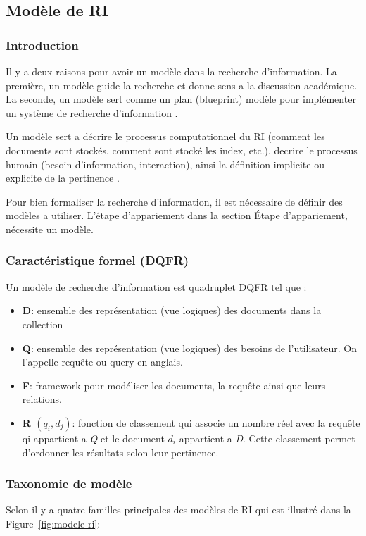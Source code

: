\subsection{Modèle de RI}
\subsubsection{Introduction}
Il y a deux raisons pour avoir un modèle dans la recherche d'information. La première, un modèle guide la recherche et donne sens a la discussion académique. La seconde, un modèle sert comme un plan (blueprint) modèle pour implémenter un système de recherche d'information \citep{model-ir}.

Un modèle sert a décrire le processus computationnel du RI (comment les documents sont stockés, comment sont stocké les index, etc.), decrire le processus humain (besoin d'information, interaction), ainsi la définition implicite ou explicite de la pertinence \citep{model-ri-cours}.

Pour bien formaliser la recherche d'information, il est nécessaire de définir des modèles a utiliser. L'étape d’appariement dans la section Étape d'appariement, nécessite un modèle.

\subsubsection{Caractéristique formel (DQFR)}
\begin{definition}
    Un modèle de recherche d'information est quadruplet DQFR tel que \citep*{modern-ir, vsm}:
    \begin{itemize}
        \item \textbf{D}: ensemble des représentation (vue logiques) des documents dans la collection
        \item \textbf{Q}: ensemble des représentation (vue logiques) des besoins de l'utilisateur. On l'appelle requête ou query en anglais.
        \item \textbf{F}: framework pour modéliser les documents, la requête ainsi que leurs relations.
        \item \textbf{R $(q_{i}, d_{j})$}: fonction de classement qui associe un nombre réel avec la requête qi appartient a \textit{Q} et le document $d_{i}$ appartient a \textit{D}. Cette classement permet d'ordonner les résultats selon leur pertinence.
    \end{itemize}
\end{definition}

\subsubsection{Taxonomie de modèle}
Selon \citeauthor{modern-ir} il y a quatre familles principales des modèles de RI qui est illustré dans la Figure~\ref{fig:modele-ri}:

